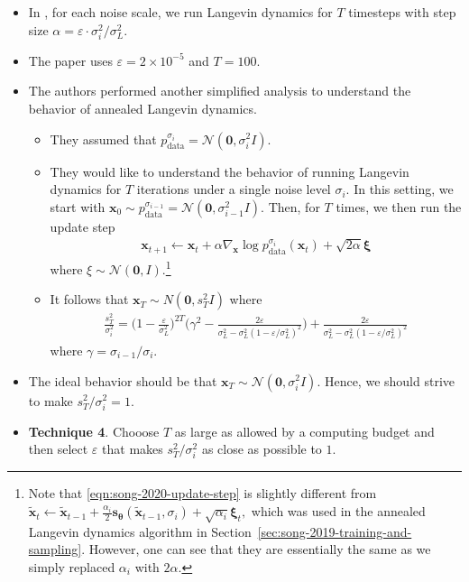 \documentclass[10pt]{article}
\newcommand{\ve}[1]{\mathbf{#1}}
\newcommand{\mrm}[1]{\mathrm{#1}}
\newcommand{\ves}[1]{\boldsymbol{#1}}
\newcommand{\mcal}[1]{\mathcal{#1}}
\begin{document}
\begin{itemize}
  \item In \cite{Song:2019}, for each noise scale, we run Langevin dynamics for $T$ timesteps with step size $\alpha = \varepsilon \cdot \sigma_i^2 / \sigma_L^2$. 
  
  \item The \cite{Song:2019} paper uses $\varepsilon = 2 \times 10^{-5}$ and $T = 100$.
  
  \item The authors performed another simplified analysis to understand the behavior of annealed Langevin dynamics.
  \begin{itemize}
    \item They assumed that $p_{\mrm{data}}^{\sigma_i} = \mcal{N}(\ve{0}, \sigma^2_i I)$.
    
    \item They would like to understand the behavior of running Langevin dynamics for $T$ iterations under a single noise level $\sigma_i$. In this setting, we start with $\ve{x}_0 \sim p_{\mrm{data}}^{\sigma_{i-1}} = \mcal{N}(\ve{0},\sigma_{i-1}^2I)$. Then, for $T$ times, we then run the update step
    \begin{align} \label{eqn:song-2020-update-step}
      \ve{x}_{t+1} \gets \ve{x}_t + \alpha \nabla_{\ve{x}} \log p_{\mrm{data}}^{\sigma_i} (\ve{x}_t) + \sqrt{2 \alpha} \ves{\xi}
    \end{align}
    where $\xi \sim \mcal{N}(\ve{0},I)$.\footnote{Note that \eqref{eqn:song-2020-update-step} is slightly different from $\widetilde{\ve{x}}_t \gets \widetilde{\ve{x}}_{t-1} + \frac{\alpha_i}{2}\ve{s}_{\ves{\theta}}(\widetilde{\ve{x}}_{t-1}, \sigma_i) + \sqrt{\alpha_i} \ves{\xi}_t,$ which was used in the annealed Langevin dynamics algorithm in Section~\ref{sec:song-2019-training-and-sampling}. However, one can see that they are essentially the same as we simply replaced $\alpha_i$ with $2\alpha$.}

    \item It follows that $\ve{x}_T \sim N(\ve{0}, s_T^2 I)$ where
    \begin{align*}
      \frac{s_T^2}{\sigma_i^2} = \bigg( 1 - \frac{\varepsilon}{\sigma_L^2} \bigg)^{2T} 
      \bigg( \gamma^2 - \frac{2\varepsilon}{\sigma_L^2 - \sigma^2_L (1 - \varepsilon/\sigma_L^2)^2} \bigg) + \frac{2\varepsilon}{\sigma_L^2 - \sigma^2_L (1 - \varepsilon/\sigma_L^2)^2}
    \end{align*}
    where $\gamma = \sigma_{i-1} / \sigma_i$.
  \end{itemize}

  \item The ideal behavior should be that $\ve{x}_T \sim \mcal{N}(\ve{0},\sigma_i^2 I)$. Hence, we should strive to make $s_T^2 / \sigma_i^2 = 1$.
  
  \item {\bf Technique 4}. Chooose $T$ as large as allowed by a computing budget and then select $\varepsilon$ that makes $s_T^2 / \sigma_i^2$ as close as possible to $1$.
\end{itemize}
\end{document}
